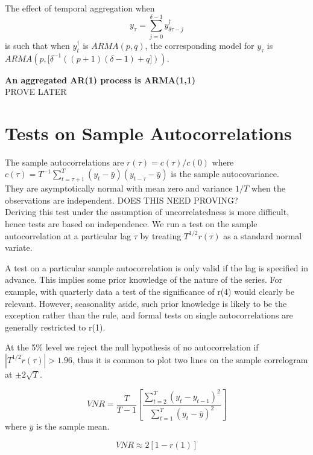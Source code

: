 \documentclass[DIV=14,titlepage=false]{scrreprt}
\begin{document}
The effect of temporal aggregation when \[
    y_\tau = \sum_{j=0}^{\delta-1} y_{\delta \tau -j}^\dagger
\]
is such that when $y_t^\dagger$ is $ARMA(p,q)$, the corresponding model for $y_\tau$ is $ARMA(p, [\delta^{-1}((p+1)(\delta -1) + q]))$.
\begin{example}
    \textbf{An aggregated AR(1) process is ARMA(1,1)}\\
    PROVE LATER
\end{example}
\section{Tests on Sample Autocorrelations}
The sample autocorrelations are $r(\tau) = c(\tau)/c(0)$ where $c(\tau) = T^{-1}\sum_{t=\tau+1}^{T} (y_t - \bar y)(y_{t-\tau} - \bar y)$ is the sample autocovariance.\\
They are asymptotically normal with mean zero and variance $1/T$ when the observations are independent. DOES THIS NEED PROVING?\\
Deriving this test under the assumption of uncorrelatedness is more difficult, hence tests are based on independence. We run a test on the sample autocorrelation at a particular lag $\tau$ by treating $T^{1/2} r(\tau)$ as a standard normal variate. 
\begin{note}
    A test on a particular sample autocorrelation is only valid if the lag is
    specified in advance. This implies some prior knowledge of the nature of the
    series. For example, with quarterly data a test of the significance of r(4)
    would clearly be relevant. However, seasonality aside, such prior knowledge
    is likely to be the exception rather than the rule, and formal tests on single
    autocorrelations are generally restricted to r(1).
\end{note}
At the 5\% level we reject the null hypothesis of no autocorrelation if $|T^{1/2} r(\tau)| > 1.96$, thus it is common to plot two lines on the sample correlogram at $\pm 2\sqrt{T}$.
\begin{definition}
  \[
    VNR = \frac{T}{T-1}\left[\frac{\sum_{t=2}^{T} (y_t - y_{t-1})^2}{\sum_{t=1}^{T}(y_t - \bar y)^2} \right]
  \]
    where $\bar y$ is the sample mean.
\end{definition}
\begin{claim}
    \[
        VNR \approx 2[1- r(1)]
    \]
\end{claim}
\end{document}
